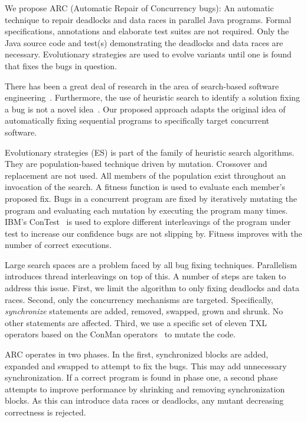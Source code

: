 \documentclass[10pt, conference, compsocconf]{IEEEtran}
\begin{document}
We propose ARC (Automatic Repair of Concurrency bugs): An automatic technique
to repair deadlocks and data races in parallel Java programs. Formal
specifications, annotations and elaborate test suites are not required. Only
the Java source code and test(s) demonstrating the deadlocks and data races are
necessary. Evolutionary strategies are used to evolve variants until one is
found that fixes the bugs in question.

There has been a great deal of research in the area of search-based software
engineering~\cite{Har+10}. Furthermore, the use of heuristic search to identify
a solution fixing a bug is not a novel idea~\cite{FNWG09, AY08, Arc08, WT10,
WNLF09, WFGN10}. Our proposed approach adapts the original idea of
automatically fixing sequential programs to specifically target concurrent
software.

Evolutionary strategies (ES) is part of the family of heuristic search
algorithms. They are population-based technique driven by mutation. Crossover
and replacement are not used.  All members of the population exist throughout
an invocation of the search. A fitness function is used to evaluate each
member's proposed fix. Bugs in a concurrent program are fixed by iteratively
mutating the program and evaluating each mutation by executing the program many
times. IBM's ConTest~\cite{EFN+02} is used to explore different interleavings
of the program under test to increase our confidence bugs are not slipping by.
Fitness improves with the number of correct executions.

Large search spaces are a problem faced by all bug fixing techniques.
Parallelism introduces thread interleavings on top of this. A number of steps
are taken to address this issue.  First, we limit the algorithm to only fixing
deadlocks and data races. Second, only the concurrency mechanisms are targeted.
Specifically, \textit{synchronize} statements are added, removed, swapped,
grown and shrunk. No other statements are affected. Third, we use a specific
set of eleven TXL~\cite{CHP91} operators based on the ConMan
operators~\cite{BCD06} to mutate the code.

ARC operates in two phases. In the first, synchronized blocks are added,
expanded and swapped to attempt to fix the bugs. This may add unnecessary
synchronization. If a correct program is found in phase one, a second phase 
attempts to improve performance by shrinking and removing synchronization
blocks. As this can introduce data races or deadlocks, any mutant
decreasing correctness is rejected.
\end{document}
